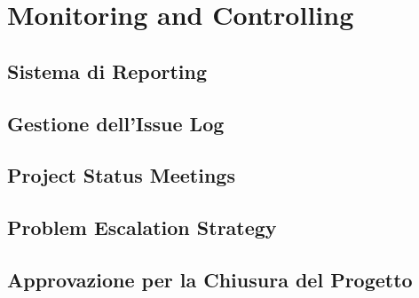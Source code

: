 \chapter{Monitoring and Controlling}

\section{Sistema di Reporting}

\section{Gestione dell'Issue Log}

\section{Project Status Meetings}

\section{Problem Escalation Strategy}

\section{Approvazione per la Chiusura del Progetto}
